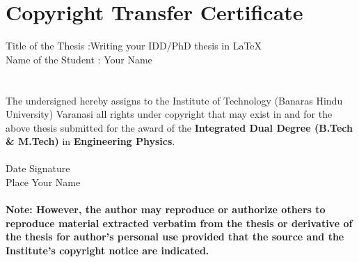 
\chapter*{\vspace{-3cm} \centering \Large Copyright Transfer Certificate}
Title of the Thesis :Writing your IDD/PhD thesis in \texorpdfstring{\LaTeX}{LaTeX} \\
Name of the Student : Your Name \\
\\
\hspace*{5.5cm}{ \centering  \bfseries \large Copyright Transfer}\\
The undersigned hereby assigns to the Institute of Technology (Banaras Hindu University) Varanasi all rights under copyright that may exist in and for the above thesis submitted for the award of the \textbf{Integrated Dual Degree (B.Tech \& M.Tech)} in \textbf{Engineering Physics}. \\
\\
Date   \hspace{5.1cm}  Signature      \\
Place \hspace{5cm} Your Name \\
\\
{\bfseries Note: However, the author may reproduce or authorize others to reproduce material extracted verbatim from the thesis or derivative of the thesis for author's personal use provided that the source and the Institute's copyright notice are indicated.}